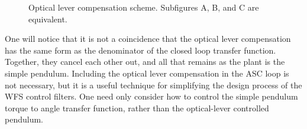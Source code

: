 \begin{figure} 
\begin{centering} 
  
\caption[Optical lever compensation scheme]{Optical lever compensation scheme. Subfigures A, B, and C are equivalent.}  
\label{fig:OLcomp} 
\end{centering} 
\end{figure}

One will notice that it is not a coincidence that the optical lever compensation has the same form as the denominator of the closed loop transfer function. Together, they cancel each other out, and all that remains as the plant is the simple pendulum. Including the optical lever compensation in the ASC loop is not necessary, but it is a useful technique for simplifying the design process of the WFS control filters. One need only consider how to control the simple pendulum torque to angle transfer function, rather than the optical-lever controlled pendulum.




